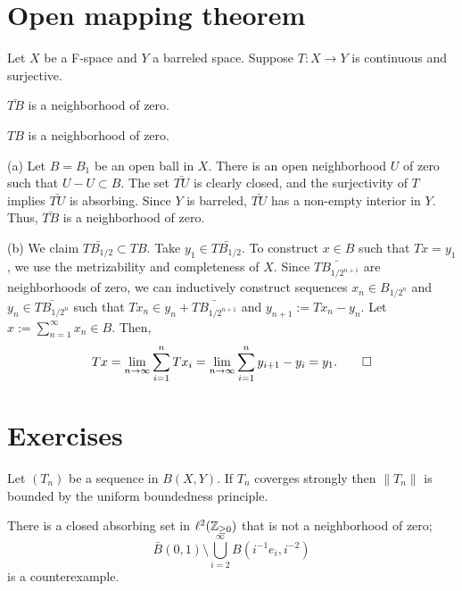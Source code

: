 \documentclass{../note}
\begin{document}
\begin{prb}
\begin{parts}
\end{parts}
\end{prb}



\section{Open mapping theorem}

\begin{prb}
Let $X$ be a F-space and $Y$ a barreled space.
Suppose $T:X\to Y$ is continuous and surjective.
\begin{parts}
\item $\bar{TB}$ is a neighborhood of zero.
\item $TB$ is a neighborhood of zero.
\end{parts}
\end{prb}

\begin{pf}
(a)
Let $B=B_1$ be an open ball in $X$.
There is an open neighborhood $U$ of zero such that $U-U\subset B$.
The set $\bar{TU}$ is clearly closed, and the surjectivity of $T$ implies $\bar{TU}$ is absorbing.
Since $Y$ is barreled, $\bar{TU}$ has a non-empty interior in $Y$.
Thus, $\bar{TB}$ is a neighborhood of zero.

(b)
We claim $\bar{TB_{1/2}}\subset TB$.
Take $y_1\in\bar{TB_{1/2}}$.
To construct $x\in B$ such that $Tx=y_1$, we use the metrizability and completeness of $X$.
Since $\bar{TB_{1/2^{n+1}}}$ are neighborhoods of zero, we can inductively construct sequences $x_n\in B_{1/2^n}$ and $y_n\in\bar{TB_{1/2^n}}$ such that $Tx_n\in y_n+\bar{TB_{1/2^{n+1}}}$ and $y_{n+1}:=Tx_n-y_n$.
Let $x:=\sum_{n=1}^\infty x_n\in B$.
Then,
\[Tx=\lim_{n\to\infty}\sum_{i=1}^nTx_i=\lim_{n\to\infty}\sum_{i=1}^ny_{i+1}-y_i=y_1.\qedhere\]
\end{pf}


\section*{Exercises}

\begin{prb}
Let $(T_n)$ be a sequence in $B(X,Y)$.
If $T_n$ coverges strongly then $\|T_n\|$ is bounded by the uniform boundedness principle.
\end{prb}

\begin{prb}
There is a closed absorbing set in $\ell^2(\mathbb{Z}_{\ge0})$ that is not a neighborhood of zero;
\[\bar B(0,1)\setminus\bigcup_{i=2}^\infty B(i^{-1}e_i,i^{-2})\]
is a counterexample.
\end{prb}
\end{document}

